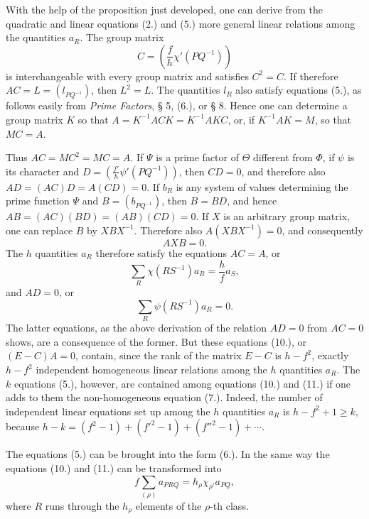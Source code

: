 \documentclass[11pt]{article}
\begin{document}
With the help of the proposition just developed, one can derive from the quadratic and linear equations (2.) and (5.) more general linear relations among the quantities $a_R$. The group matrix
\[
C=\left(\frac{f}{h}\chi'(PQ^{-1})\right)
\]
is interchangeable with every group matrix and satisfies $C^2=C$. If therefore $AC=L=(l_{PQ^{-1}})$, then $L^2=L$. The quantities $l_R$ also satisfy equations (5.), as follows easily from \emph{Prime Factors}, § 5, (6.), or § 8. Hence one can determine a group matrix $K$ so that $A=K^{-1}ACK=K^{-1}AKC$, or, if $K^{-1}AK=M$, so that $MC=A$.

Thus $AC=MC^2=MC=A$. If $\Psi$ is a prime factor of $\Theta$ different from $\Phi$, if $\psi$ is its character and $D=\left(\frac{f'}{h}\psi'(PQ^{-1})\right)$, then $CD=0$, and therefore also $AD=(AC)D=A(CD)=0$. If $b_R$ is any system of values determining the prime function $\Psi$ and $B=(b_{PQ^{-1}})$, then $B=BD$, and hence $AB=(AC)(BD)=(AB)(CD)=0$. If $X$ is an arbitrary group matrix, one can replace $B$ by $XBX^{-1}$. Therefore also $A(XBX^{-1})=0$, and consequently
\begin{equation}\tag{9.}
AXB=0.
\end{equation}
The $h$ quantities $a_R$ therefore satisfy the equations $AC=A$, or
\begin{equation}\tag{10.}
\sum_R\chi(RS^{-1})a_R=\frac{h}{f}a_S,
\end{equation}
and $AD=0$, or
\begin{equation}\tag{11.}
\sum_R\psi(RS^{-1})a_R=0.
\end{equation}
The latter equations, as the above derivation of the relation $AD=0$ from $AC=0$ shows, are a consequence of the former. But these equations (10.), or $(E-C)A=0$, contain, since the rank of the matrix $E-C$ is $h-f^2$, exactly $h-f^2$ independent homogeneous linear relations among the $h$ quantities $a_R$. The $k$ equations (5.), however, are contained among equations (10.) and (11.) if one adds to them the non-homogeneous equation (7.). Indeed, the number of independent linear equations set up among the $h$ quantities $a_R$ is $h-f^2+1\geq k$, because $h-k=(f^2-1)+(f'^2-1)+(f''^2-1)+\cdots$.

The equations (5.) can be brought into the form (6.). In the same way the equations (10.) and (11.) can be transformed into
\begin{equation}\tag{12.}
f\sum_{(\rho)}a_{PRQ}=h_\rho\chi_{\rho'}a_{PQ},
\end{equation}
where $R$ runs through the $h_\rho$ elements of the $\rho$-th class.
\end{document}
